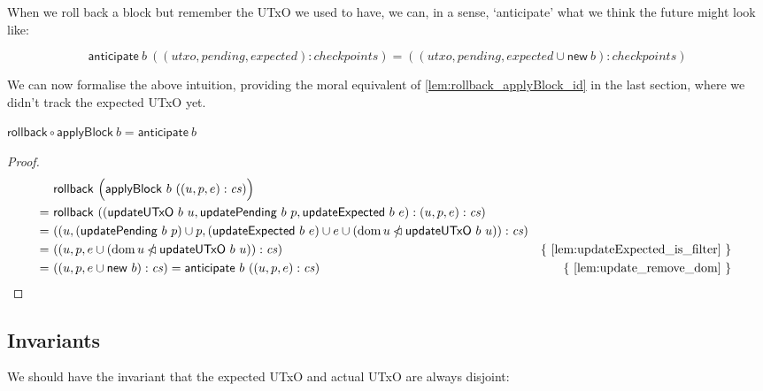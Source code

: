 \documentclass{article}
\newcommand{\restrictdom}{\lhd}
\newcommand{\subtractdom}{\mathbin{\slashed{\restrictdom}}}
\DeclareMathOperator{\dom}{dom}
\theoremstyle{definition}{
  \newtheorem{lemma}{Lemma}[section] %
  \newtheorem{definition}[lemma]{Definition}
}
\theoremstyle{theorem}{
  \newtheorem{invariant}[lemma]{Invariant}
  \newtheorem{proofobligation}[lemma]{Proof Obligation}
}
\numberwithin{equation}{lemma}
\begin{document}
When we roll back a block but remember the UTxO we used to have, we
can, in a sense, `anticipate' what we think the future might look like:

\begin{definition}
\begin{equation*}
  \mathsf{anticipate} ~ b ~ ((\mathit{utxo}, \mathit{pending}, \mathit{expected}) : \mathit{checkpoints})
= ((\mathit{utxo}, \mathit{pending}, \mathit{expected} \cup \mathsf{new} ~ b) : \mathit{checkpoints})
\end{equation*}
\end{definition}

We can now formalise the above intuition, providing the moral equivalent
of \cref{lem:rollback_applyBlock_id} in the last section, where we didn't
track the expected UTxO yet.

\begin{lemma}
\begin{math}
  \mathsf{rollback} \circ \mathsf{applyBlock} ~ b = \mathsf{anticipate} ~ b
\end{math}
\end{lemma}

\begin{proof}
\begin{align*}
  & ~ \mathsf{rollback} ~ \Bigl( \mathsf{applyBlock} ~ b ~ ((u, p, e) : \mathit{cs}) \Bigr) \\
= & ~ \mathsf{rollback} ~ ((\mathsf{updateUTxO} ~ b ~ u, \mathsf{updatePending} ~ b ~ p, \mathsf{updateExpected} ~ b ~ e) : (u, p, e) : \mathit{cs}) \\
= & ~ ((u, (\mathsf{updatePending} ~ b ~ p) \cup p,  (\mathsf{updateExpected} ~ b ~ e) \cup e \cup (\dom u \subtractdom \mathsf{updateUTxO} ~ b ~ u)) : \mathit{cs}) \\
= & ~ ((u, p, e \cup (\dom u \subtractdom \mathsf{updateUTxO} ~ b ~ u)) : \mathit{cs}) & \text{\{ \cref{lem:updateExpected_is_filter} \} } \\
= & ~ ((u, p, e \cup \mathsf{new} ~ b) : \mathit{cs}) = \mathsf{anticipate} ~ b ~ ((u, p, e) : \mathit{cs}) & \text{\{ \cref{lem:update_remove_dom} \} }
\end{align*}
\end{proof}

\subsection{Invariants}

We should have the invariant that the expected UTxO and actual UTxO are always
disjoint:
\end{document}
